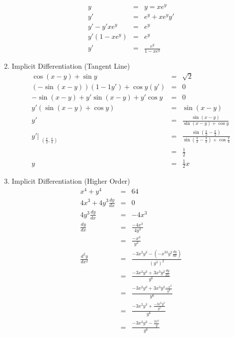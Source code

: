 \documentclass{article}
\begin{document}
\begin{enumerate}
    \begin{eqnarray}
        y &=& y = xe^y \\
        y' &=& e^y + xe^yy' \\
        y' - y'xe^y &=& e^y \\
        y'(1 - xe^y) &=& e^y \\
        y' &=& \frac{e^y}{1 - xe^y}
    \end{eqnarray}
    \item Implicit Differentiation (Tangent Line)
    \begin{eqnarray}
        \cos{(x - y)} + \sin{y} &=& \sqrt{2} \\
        \left(-\sin{(x - y)}\right)\left(1 - 1y'\right) + \cos{y}\left(y'\right) &=& 0 \\
        -\sin{(x - y)} + y'\sin{(x - y)} + y'\cos{y} &=& 0 \\
        y'\left(\sin{(x - y)} + \cos{y}\right) &=& \sin{(x - y)} \\
        y' &=& \frac{\sin{(x - y)}}{\sin{(x - y)} + \cos{y}} \\
        y'\Bigr|_{\substack{\left(\frac{\pi}{2},\frac{\pi}{4}\right)}} &=& \frac{\sin{(\frac{\pi}{2} - \frac{\pi}{2})}}{\sin{(\frac{\pi}{2} - \frac{\pi}{2})} + \cos{\frac{\pi}{4}}} \\
        &=& \frac{1}{2} \\
        y &=& \frac{1}{2}x
    \end{eqnarray}
    \item Implicit Differentiation (Higher Order)
    \begin{eqnarray}
        x^4 + y^4 &=& 64 \\
        4x^3 + 4y^3\frac{dy}{dx} &=& 0 \\
        4y^3\frac{dy}{dx} &=& -4x^3 \\
        \frac{dy}{dx} &=& \frac{-4x^3}{4y^3} \\
                      &=& \frac{-x^3}{y^3} \\
        \frac{d^2y}{dx^2} &=& \frac{-3x^2y^3 - \left(-x^33y^2\frac{dy}{dx}\right)}{\left(y^3\right)^2} \\
                          &=& \frac{-3x^2y^3 + 3x^3y^2\frac{dy}{dx}}{y^6} \\
                          &=& \frac{-3x^2y^3 + 3x^3y^2\frac{-x^3}{y^3}}{y^6} \\
                          &=& \frac{-3x^2y^3 + \frac{-3x^6y^2}{y^3}}{y^6} \\
                          &=& \frac{-3x^2y^3 - \frac{3x^6}{y}}{y^6} \\

\end{eqnarray}
\end{enumerate}
\end{document}
